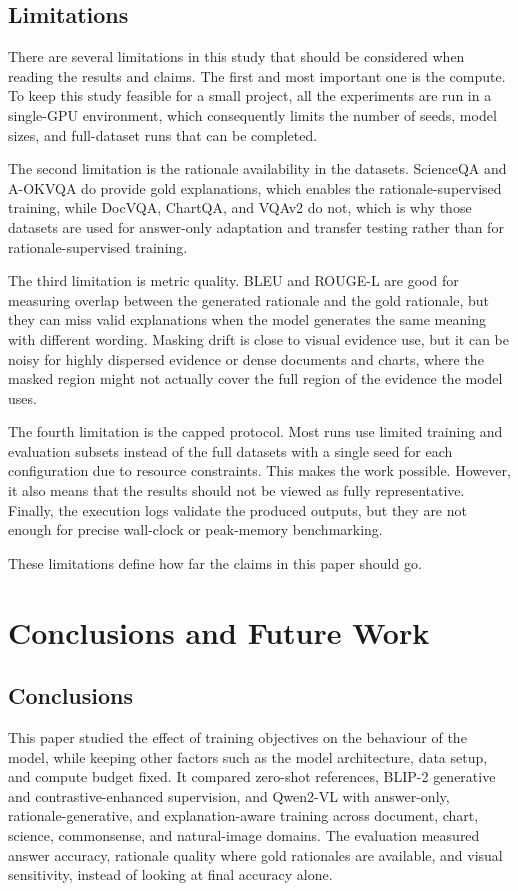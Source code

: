 \documentclass[12pt,bibliography=totoc,listof=totoc,BCOR=5mm,DIV=12,oneside,open=any]{scrbook}
\begin{document}
\section{Limitations}
There are several limitations in this study that should be considered when reading the results and claims.
The first and most important one is the compute.
To keep this study feasible for a small project, all the experiments are run in a single-GPU environment, which consequently limits the number of seeds, model sizes, and full-dataset runs that can be completed.

The second limitation is the rationale availability in the datasets.
ScienceQA and A-OKVQA do provide gold explanations, which enables the rationale-supervised training, while DocVQA, ChartQA, and VQAv2 do not, which is why those datasets are used for answer-only adaptation and transfer testing rather than for rationale-supervised training.

The third limitation is metric quality.
BLEU and ROUGE-L are good for measuring overlap between the generated rationale and the gold rationale, but they can miss valid explanations when the model generates the same meaning with different wording.
Masking drift is close to visual evidence use, but it can be noisy for highly dispersed evidence or dense documents and charts, where the masked region might not actually cover the full region of the evidence the model uses.

The fourth limitation is the capped protocol.
Most runs use limited training and evaluation subsets instead of the full datasets with a single seed for each configuration due to resource constraints.
This makes the work possible. However, it also means that the results should not be viewed as fully representative.
Finally, the execution logs validate the produced outputs, but they are not enough for precise wall-clock or peak-memory benchmarking.

These limitations define how far the claims in this paper should go.
\chapter{Conclusions and Future Work}
\section{Conclusions}
This paper studied the effect of training objectives on the behaviour of the model, while keeping other factors such as the model architecture, data setup, and compute budget fixed.
It compared zero-shot references, BLIP-2 generative and contrastive-enhanced supervision, and Qwen2-VL with answer-only, rationale-generative, and explanation-aware training across document, chart, science, commonsense, and natural-image domains.
The evaluation measured answer accuracy, rationale quality where gold rationales are available, and visual sensitivity, instead of looking at final accuracy alone.
\end{document}
